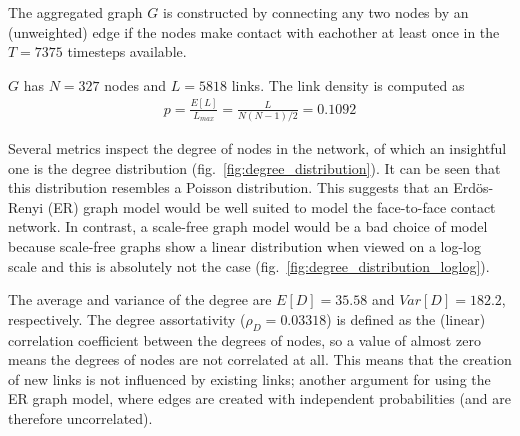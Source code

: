 \documentclass[letterpaper]{article}
\begin{document}
The aggregated graph \(G\) is constructed by connecting any two nodes by an (unweighted) edge if the nodes make contact with eachother at least once in the \(T=7375\) timesteps available.

\(G\) has \(N=327\) nodes and \(L=5818\) links. The link density is computed as
\begin{align*}
p = \frac{E[L]}{L_{max}} = \frac{L}{N(N-1)/2} = 0.1092
\end{align*}

Several metrics inspect the degree of nodes in the network, of which an insightful one is the degree distribution (fig.~\ref{fig:degree_distribution}). It can be seen that this distribution resembles a Poisson distribution. This suggests that an Erdös-Renyi (ER) graph model would be well suited to model the face-to-face contact network. In contrast, a scale-free graph model would be a bad choice of model because scale-free graphs show a linear distribution when viewed on a log-log scale and this is absolutely not the case (fig.~\ref{fig:degree_distribution_loglog}).

The average and variance of the degree are \(E[D]=35.58\) and \(Var[D]=182.2\), respectively. The degree assortativity (\(\rho_D=0.03318\)) is defined as the (linear) correlation coefficient between the degrees of nodes, so a value of almost zero means the degrees of nodes are not correlated at all. This means that the creation of new links is not influenced by existing links; another argument for using the ER graph model, where edges are created with independent probabilities (and are therefore uncorrelated).
\end{document}
